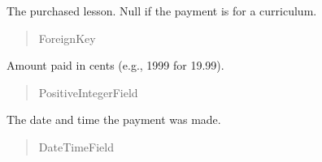 \documentclass[letterpaper,10pt,english]{sphinxmanual}
\begin{document}
\begin{fulllineitems}
\begin{fulllineitems}
\begin{quote}
\begin{description}
\end{description}\end{quote}

\end{fulllineitems}


\begin{fulllineitems}
\label{\detokenize{payments:payments.models.Payment.lesson}}
\pysigstartsignatures
\pysigline
{}
\pysigstopsignatures
\sphinxAtStartPar
The purchased lesson. Null if the payment is for a curriculum.
\begin{quote}\begin{description}
\sphinxAtStartPar
ForeignKey

\end{description}\end{quote}

\end{fulllineitems}


\begin{fulllineitems}
\label{\detokenize{payments:payments.models.Payment.amount}}
\pysigstartsignatures
\pysigline
{}
\pysigstopsignatures
\sphinxAtStartPar
Amount paid in cents (e.g., 1999 for \texteuro{}19.99).
\begin{quote}\begin{description}
\sphinxAtStartPar
PositiveIntegerField

\end{description}\end{quote}

\end{fulllineitems}


\begin{fulllineitems}
\label{\detokenize{payments:payments.models.Payment.timestamp}}
\pysigstartsignatures
\pysigline
{}
\pysigstopsignatures
\sphinxAtStartPar
The date and time the payment was made.
\begin{quote}\begin{description}
\sphinxAtStartPar
DateTimeField


\end{description}
\end{quote}
\end{fulllineitems}
\end{fulllineitems}
\end{document}
